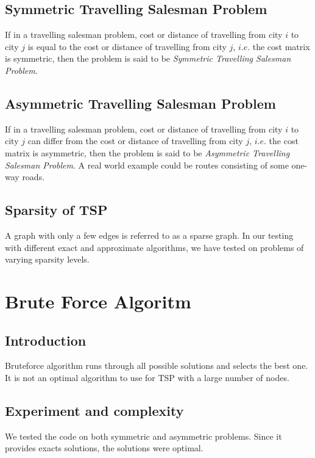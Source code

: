 \documentclass[14pt, english]{article}
\begin{document}
\subsection{Symmetric Travelling Salesman Problem}

If in a travelling salesman problem, cost or distance of travelling from city $i$ to city $j$ is equal to the cost or distance of travelling from city $j$, $i.e.$ the cost matrix is symmetric, then the problem is said to be \emph{Symmetric Travelling Salesman Problem}.

\subsection{Asymmetric Travelling Salesman Problem}

If in a travelling salesman problem, cost or distance of travelling from city $i$ to city $j$ can differ from the cost or distance of travelling from city $j$, $i.e.$ the cost matrix is asymmetric, then the problem is said to be \emph{Asymmetric Travelling Salesman Problem}. A real world example could be routes consisting of some one-way roads.


\subsection{Sparsity of TSP}

\noindent
A graph with only a few edges is referred to as a sparse graph. In our testing with different exact and approximate algorithms, we have tested on problems of varying sparsity levels.

\newpage
\section{Brute Force Algoritm}
\subsection{Introduction}
Bruteforce algorithm runs through all possible solutions and selects the best one. It is not an optimal algorithm to use for TSP with a large number of nodes.

\subsection{Experiment and complexity}

We tested the code on both symmetric and asymmetric problems. Since it provides exacts solutions, the solutions were optimal.\\
\end{document}
